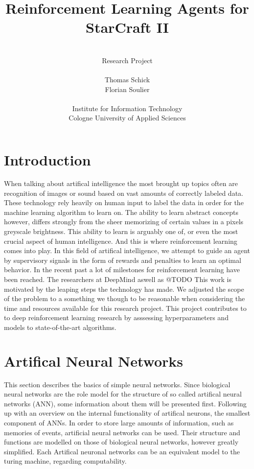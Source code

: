 \documentclass[12pt,a4paper]{article}
\author{\\Research Project\\ \\Thomas Schick\\Florian Soulier\\ \\ Institute for Information Technology\\
Cologne University of Applied Sciences}
\title{Reinforcement Learning Agents for StarCraft II}
\begin{document}
\maketitle
{}
\newpage
\tableofcontents{}
\newpage
{}
\section{Introduction} 
When talking about artifical intelligence the most brought up topics often are recognition of images or sound based on vast amounts of correctly labeled data.
These technology rely heavily on human input to label the data in order for the machine learning algorithm to learn on.
The ability to learn abstract concepts however, differs strongly from the sheer memorizing of certain values in a pixels greyscale brightness.
This ability to learn is arguably one of, or even the most crucial aspect of human intelligence. And this is where reinforcement learning comes into play.
In this field of artifical intelligence, we attempt to guide an agent by supervisory signals in the form of rewards and penalties to learn an optimal behavior.
In the recent past a lot of milestones for reinforcement learning have been reached. The researchers at DeepMind aswell as @TODO
This work is motivated by the leaping steps the technology has made.
We adjusted the scope of the problem to a something we though to be reasonable when considering the time and resources available for this research project. 
This project contributes to to deep reinforcement learning research by asssessing hyperparameters and models to state-of-the-art algorithms.
\section{Artifical Neural Networks}
This section describes the basics of simple neural networks. Since biological neural networks are the role model for the structure of so called artifical neural networks (ANN), some information about them will be presented first.
Following up with an overview on the internal functionality of artifical neurons, the smallest component of ANNs.
In order to store large amounts of information, such as memories of events, artificial neural networks can be used. Their structure and functions are modelled on those of biological neural networks, however greatly simplified.
Each 
Artifical neuronal networks can be an equivalent model to the turing machine, regarding computability.
\end{document}
